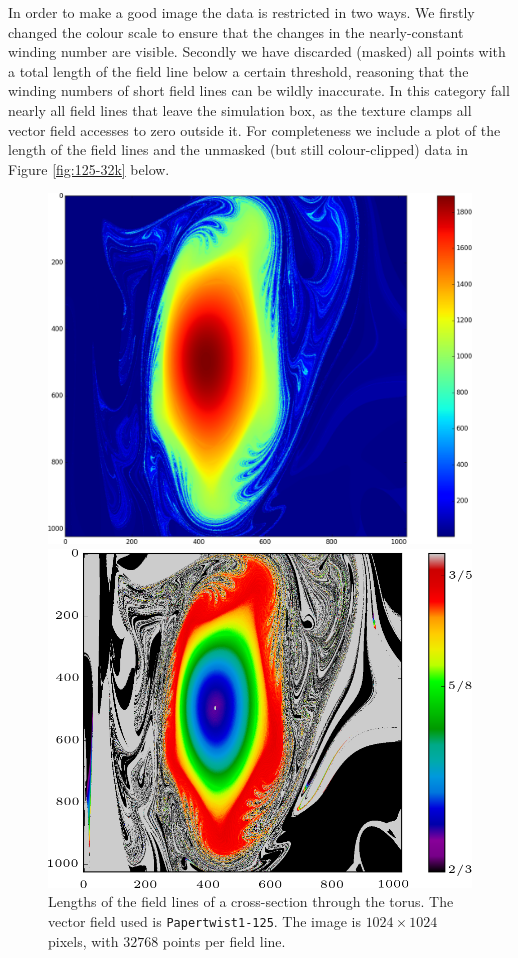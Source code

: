 \documentclass[a4paper]{article}
\begin{document}
In order to make a good image the data is restricted in two ways. 
We firstly changed the colour scale to ensure that the changes in the nearly-constant winding number are visible. 
Secondly we have discarded (masked) all points with a total length of the field line below a certain threshold, reasoning that the winding numbers of short field lines can be wildly inaccurate. 
In this category fall nearly all field lines that leave the simulation box, as the texture clamps all vector field accesses to zero outside it.
For completeness we include a plot of the length of the field lines and the unmasked (but still colour-clipped) data in Figure \ref{fig:125-32k} below.\\

\begin{figure}[!hb]
  \includegraphics[width=\linewidth]{Figures/Rings_Papertwist_twist1_125_lengths_steps32k.png}
	\caption{Lengths of the field lines of a cross-section through the torus. The vector field used is \texttt{Papertwist1-125}. The image is $1024\times 1024$ pixels, with $32768$ points per field line.}\label{fig:125-lengths}
\endminipage\hfill
{}
  \includegraphics[width=\linewidth]{Figures/Rings_Papertwist_twist1_125_nomask_steps32k.png}

\end{figure}
\end{document}
